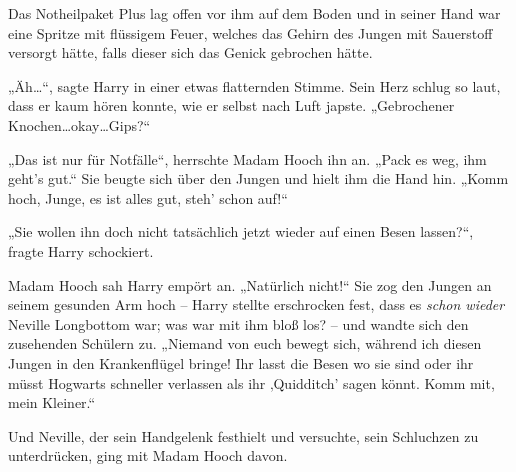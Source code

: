 Das Notheilpaket Plus lag offen vor ihm auf dem Boden und in seiner Hand war eine Spritze mit flüssigem Feuer, welches das Gehirn des Jungen mit Sauerstoff versorgt hätte, falls dieser sich das Genick gebrochen hätte.

„Äh…“, sagte Harry in einer etwas flatternden Stimme. Sein Herz schlug so laut, dass er kaum hören konnte, wie er selbst nach Luft japste. „Gebrochener Knochen…okay…Gips?“

„Das ist nur für Notfälle“, herrschte Madam Hooch ihn an. „Pack es weg, ihm geht’s gut.“ Sie beugte sich über den Jungen und hielt ihm die Hand hin. „Komm hoch, Junge, es ist alles gut, steh’ schon auf!“

„Sie wollen ihn doch nicht tatsächlich jetzt wieder auf einen Besen lassen?“, fragte Harry schockiert.

Madam Hooch sah Harry empört an. „Natürlich nicht!“ Sie zog den Jungen an seinem gesunden Arm hoch – Harry stellte erschrocken fest, dass es \emph{schon wieder} Neville Longbottom war; was war mit ihm bloß los? – und wandte sich den zusehenden Schülern zu. „Niemand von euch bewegt sich, während ich diesen Jungen in den Krankenflügel bringe! Ihr lasst die Besen wo sie sind oder ihr müsst Hogwarts schneller verlassen als ihr ‚Quidditch’ sagen könnt. Komm mit, mein Kleiner.“

Und Neville, der sein Handgelenk festhielt und versuchte, sein Schluchzen zu unterdrücken, ging mit Madam Hooch davon.

